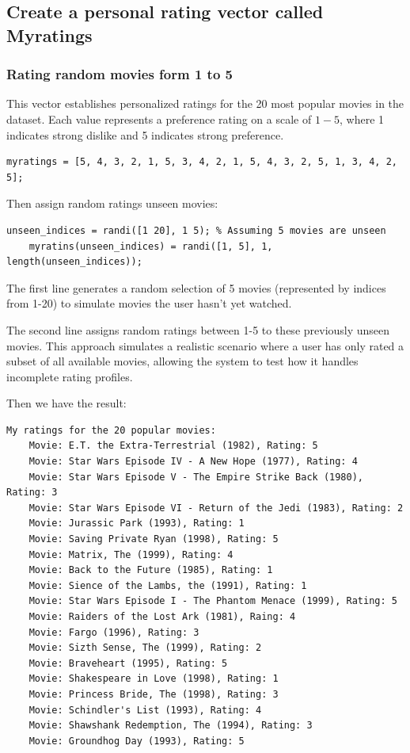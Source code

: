 \subsection{Create a personal rating vector called Myratings}

\subsubsection{Rating random movies form 1 to 5}

This vector establishes personalized ratings for the 20 most popular movies in the dataset. Each value represents a preference rating on a scale of $1-5$, where 1 indicates strong dislike and 5 indicates strong preference.

\begin{lstlisting}[style=StyleResult]
	myratings = [5, 4, 3, 2, 1, 5, 3, 4, 2, 1, 5, 4, 3, 2, 5, 1, 3, 4, 2, 5];
\end{lstlisting}

Then assign random ratings unseen movies:

\begin{lstlisting}[style=StyleResult]
	unseen_indices = randi([1 20], 1 5); % Assuming 5 movies are unseen
	myratins(unseen_indices) = randi([1, 5], 1, length(unseen_indices));
\end{lstlisting}

The first line generates a random selection of 5 movies (represented by indices from 1-20) to simulate movies the user hasn't yet watched. 

The second line assigns random ratings between 1-5 to these previously unseen movies. This approach simulates a realistic scenario where a user has only rated a subset of all available movies, allowing the system to test how it handles incomplete rating profiles.

Then we have the result:

\begin{lstlisting}[style=StyleResult]
	My ratings for the 20 popular movies:
	Movie: E.T. the Extra-Terrestrial (1982), Rating: 5
	Movie: Star Wars Episode IV - A New Hope (1977), Rating: 4
	Movie: Star Wars Episode V - The Empire Strike Back (1980), Rating: 3
	Movie: Star Wars Episode VI - Return of the Jedi (1983), Rating: 2
	Movie: Jurassic Park (1993), Rating: 1
	Movie: Saving Private Ryan (1998), Rating: 5
	Movie: Matrix, The (1999), Rating: 4
	Movie: Back to the Future (1985), Rating: 1
	Movie: Sience of the Lambs, the (1991), Rating: 1
	Movie: Star Wars Episode I - The Phantom Menace (1999), Rating: 5
	Movie: Raiders of the Lost Ark (1981), Raing: 4
	Movie: Fargo (1996), Rating: 3
	Movie: Sizth Sense, The (1999), Rating: 2
	Movie: Braveheart (1995), Rating: 5
	Movie: Shakespeare in Love (1998), Rating: 1
	Movie: Princess Bride, The (1998), Rating: 3
	Movie: Schindler's List (1993), Rating: 4
	Movie: Shawshank Redemption, The (1994), Rating: 3
	Movie: Groundhog Day (1993), Rating: 5
\end{lstlisting}

